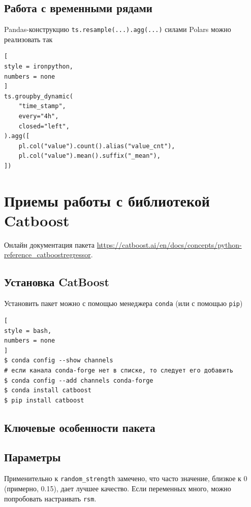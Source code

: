\documentclass[%
	11pt,
	a4paper,
	utf8,
		]{article}
\begin{document}
\subsection{Работа с временными рядами}

Pandas-конструкцию \verb*|ts.resample(...).agg(...)| силами Polars можно реализовать так
\begin{lstlisting}[
style = ironpython,
numbers = none
]
ts.groupby_dynamic(
    "time_stamp",
    every="4h",
    closed="left",
).agg([
    pl.col("value").count().alias("value_cnt"),
    pl.col("value").mean().suffix("_mean"),
])
\end{lstlisting}


\section{Приемы работы с библиотекой Catboost}

Онлайн документация пакета \url{https://catboost.ai/en/docs/concepts/python-reference_catboostregressor}.

\subsection{Установка CatBoost}

Установить пакет можно с помощью менеджера \texttt{conda} (или с помощью \texttt{pip})
\begin{lstlisting}[
style = bash,
numbers = none
]
$ conda config --show channels
# если канала conda-forge нет в списке, то следует его добавить 
$ conda config --add channels conda-forge
$ conda install catboost
$ pip install catboost
\end{lstlisting}

\subsection{Ключевые особенности пакета}

\subsection{Параметры}


Применительно к \texttt{random\_strength} замечено, что часто значение, близкое к 0 (примерно, 0.15), дает лучшее качество. Если переменных много, можно попробовать настраивать \texttt{rsm}.
\end{document}
